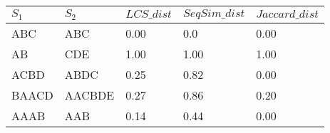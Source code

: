 \begin{tabular}{lllll}
\toprule
$S_1$ & $S_2$ & $LCS\_dist$ & $SeqSim\_dist$ & $Jaccard\_dist$\\
\midrule
ABC & ABC & 0.00 & 0.0 & 0.00 \\
AB & CDE & 1.00 & 1.00 & 1.00 \\
ACBD & ABDC & 0.25 & 0.82 & 0.00 \\
BAACD & AACBDE & 0.27 & 0.86 & 0.20 \\
AAAB & AAB & 0.14 & 0.44 & 0.00 \\
\bottomrule
\end{tabular}
